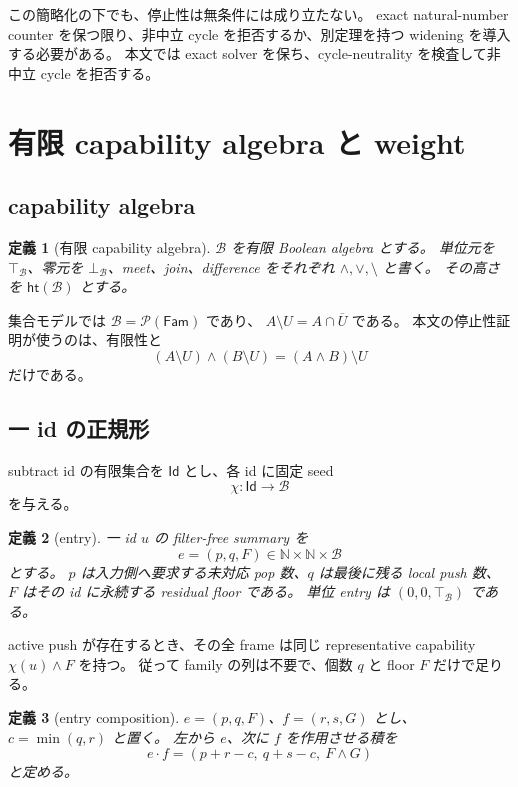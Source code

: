 \documentclass[uplatex,dvipdfmx,a4paper,10.5pt]{jsarticle}
\theoremstyle{jpplain}
\newtheorem{definition}{定義}[section]
\newcommand{\Caps}{\mathcal B}
\newcommand{\Id}{\mathsf{Id}}
\newcommand{\Nat}{\mathbb N}
\newcommand{\topc}{\top_{\Caps}}
\newcommand{\botc}{\bot_{\Caps}}
\newcommand{\meet}{\mathbin{\wedge}}
\newcommand{\join}{\mathbin{\vee}}
\newcommand{\diff}{\mathbin{\setminus}}
\newcommand{\wcomp}{\mathbin{\cdot}}
\newcommand{\seed}{\chi}
\newcommand{\capheight}{\mathsf{ht}}
\begin{document}
\begin{statusbox}
この簡略化の下でも、停止性は無条件には成り立たない。
exact natural-number counter を保つ限り、非中立 cycle を拒否するか、別定理を持つ widening を導入する必要がある。
本文では exact solver を保ち、cycle-neutrality を検査して非中立 cycle を拒否する。
\end{statusbox}

\section{有限 capability algebra と weight}

\subsection{capability algebra}

\begin{definition}[有限 capability algebra]
$\Caps$ を有限 Boolean algebra とする。
単位元を $\topc$、零元を $\botc$、meet、join、difference をそれぞれ
$\meet,\join,\diff$ と書く。
その高さを $\capheight(\Caps)$ とする。
\end{definition}

集合モデルでは $\Caps=\mathcal P(\mathsf{Fam})$ であり、
$A\diff U=A\cap\overline U$ である。
本文の停止性証明が使うのは、有限性と
\[
 (A\diff U)\meet(B\diff U)=(A\meet B)\diff U
\]
だけである。

\subsection{一 id の正規形}

subtract id の有限集合を $\Id$ とし、各 id に固定 seed
\[
  \seed:\Id\to\Caps
\]
を与える。

\begin{definition}[entry]
一 id $u$ の filter-free summary を
\[
  e=(p,q,F)\in\Nat\times\Nat\times\Caps
\]
とする。
$p$ は入力側へ要求する未対応 pop 数、$q$ は最後に残る local push 数、
$F$ はその id に永続する residual floor である。
単位 entry は $(0,0,\topc)$ である。
\end{definition}

active push が存在するとき、その全 frame は同じ representative capability
$\seed(u)\meet F$ を持つ。
従って family の列は不要で、個数 $q$ と floor $F$ だけで足りる。

\begin{definition}[entry composition]
$e=(p,q,F)$、$f=(r,s,G)$ とし、$c=\min(q,r)$ と置く。
左から $e$、次に $f$ を作用させる積を
\[
  e\wcomp f
  =
  (p+r-c,\ q+s-c,\ F\meet G)
\]
と定める。
\end{definition}
\end{document}

